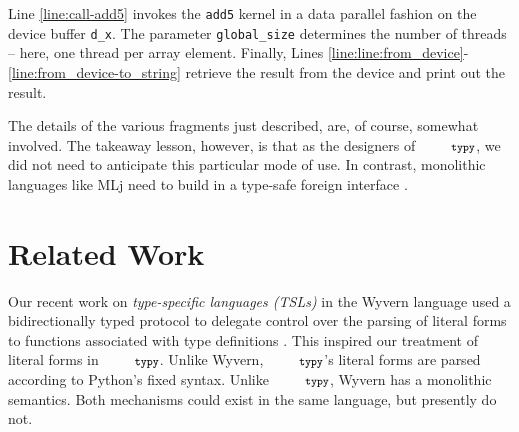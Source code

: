 \documentclass[10pt]{sigplanconf}
\newcommand{\typy}{\texttt{\footnotesize typy}}
\newcommand{\lip}[1]{\lstinline[language=Python,basicstyle=\ttfamily\footnotesize,morekeywords={with},deletendkeywords={tuple,buffer,map}]{#1}}
\newcommand{\li}[1]{\lip{#1}}
\begin{document}
Line \ref{line:call-add5} invokes the \li{add5} kernel in a data parallel fashion on the device buffer \li{d_x}. The parameter \li{global_size} determines the number of threads -- here, one thread per array element. Finally, Lines \ref{line:line:from_device}-\ref{line:from_device-to_string} retrieve the result from the device and print out the result.

The details of the various fragments just described, are, of course, somewhat involved. The takeaway lesson, however, is that as the designers of $\typy$, we did not need to anticipate this particular mode of use. 
In contrast, monolithic languages like MLj need to build in a type-safe foreign interface \cite{Benton:1999:IWW:317636.317791}. %

\section{Related Work}\label{related}\label{sec:related-work}

%




Our recent work on \emph{type-specific languages (TSLs)} in the Wyvern language used a bidirectionally typed protocol to delegate control over the parsing of literal forms to functions associated with type definitions \cite{TSLs}. This inspired our treatment of literal forms in $\typy$. Unlike Wyvern, $\typy$'s literal forms are parsed according to Python's fixed syntax. Unlike $\typy$, Wyvern has a monolithic semantics. Both mechanisms could exist in the same language, but presently do not. %
\end{document}
